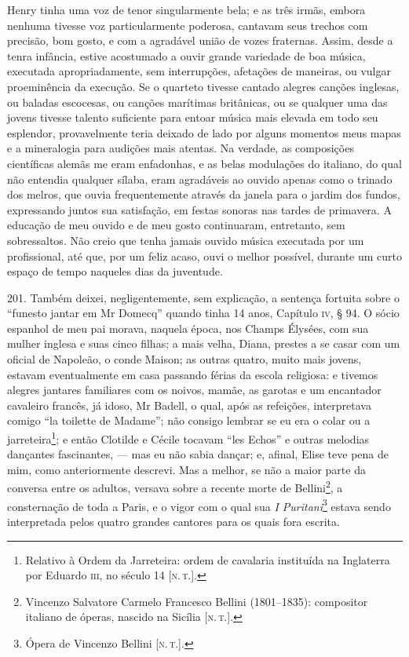 Henry tinha uma voz de tenor singularmente bela; e as três irmãs, embora
nenhuma tivesse voz particularmente poderosa, cantavam seus trechos com
precisão, bom gosto, e com a agradável união de vozes fraternas. Assim,
desde a tenra infância, estive acostumado a ouvir grande variedade de
boa música, executada apropriadamente, sem interrupções, afetações de
maneiras, ou vulgar proeminência da execução. Se o quarteto tivesse
cantado alegres canções inglesas, ou baladas escocesas, ou canções
marítimas britânicas, ou se qualquer uma das jovens tivesse talento
suficiente para entoar música mais elevada em todo seu esplendor,
provavelmente teria deixado de lado por alguns momentos meus mapas e a
mineralogia para audições mais atentas. Na verdade, as composições
científicas alemãs me eram enfadonhas, e as belas modulações do
italiano, do qual não entendia qualquer sílaba, eram agradáveis ao
ouvido apenas como o trinado dos melros, que ouvia frequentemente
através da janela para o jardim dos fundos, expressando juntos sua
satisfação, em festas sonoras nas tardes de primavera. A educação de meu
ouvido e de meu gosto continuaram, entretanto, sem sobressaltos. Não
creio que tenha jamais ouvido música executada por um profissional, até
que, por um feliz acaso, ouvi o melhor possível, durante um curto espaço
de tempo naqueles dias da juventude.

201. Também deixei, negligentemente, sem explicação, a sentença fortuita
sobre o ``funesto jantar em Mr Domecq'' quando tinha 14 anos, Capítulo
\textsc{iv}, § 94. O sócio espanhol de meu pai morava, naquela época, nos Champs
Élysées, com sua mulher inglesa e suas cinco filhas; a mais velha,
Diana, prestes a se casar com um oficial de Napoleão, o conde Maison; as
outras quatro, muito mais jovens, estavam eventualmente em casa passando
férias da escola religiosa: e tivemos alegres jantares familiares com os
noivos, mamãe, as garotas e um encantador cavaleiro francês, já idoso,
Mr Badell, o qual, após as refeições, interpretava comigo ``la toilette
de Madame''; não consigo lembrar se eu era o colar ou a
jarreteira\footnote{Relativo à Ordem da Jarreteira: ordem de cavalaria
  instituída na Inglaterra por Eduardo \textsc{iii}, no século 14 {[}\textsc{n.\,t.}{]}.};
e então Clotilde e Cécile tocavam ``les Echos'' e outras melodias
dançantes fascinantes, --- mas eu não sabia dançar; e, afinal, Elise teve
pena de mim, como anteriormente descrevi. Mas a melhor, se não a maior
parte da conversa entre os adultos, versava sobre a recente morte de
Bellini\footnote{Vincenzo Salvatore Carmelo Francesco Bellini
  (1801--1835): compositor italiano de óperas, nascido na Sicília {[}\textsc{n.\,t.}{]}.}, a consternação de toda a Paris, e o vigor com o qual sua
\emph{I Puritani}\footnote{Ópera de Vincenzo Bellini {[}\textsc{n.\,t.}{]}.}
estava sendo interpretada pelos quatro grandes cantores para os quais
fora escrita.


